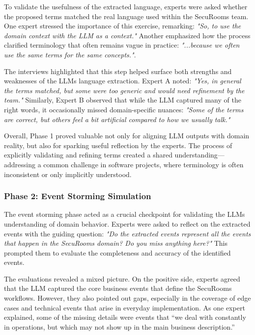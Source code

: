 To validate the usefulness of the extracted language, experts were asked whether the proposed terms matched the real language used within the SecuRooms team. One expert stressed the importance of this exercise, remarking: \textit{"So, to use the domain context with the LLM as a context."} Another emphasized how the process clarified terminology that often remains vague in practice: \textit{"...because we often use the same terms for the same concepts."}.  

The interviews highlighted that this step helped surface both strengths and weaknesses of the LLMs language extraction. Expert A noted: \textit{"Yes, in general the terms matched, but some were too generic and would need refinement by the team."} Similarly, Expert B observed that while the LLM captured many of the right words, it occasionally missed domain-specific nuances: \textit{"Some of the terms are correct, but others feel a bit artificial compared to how we usually talk."}  

Overall, Phase 1 proved valuable not only for aligning LLM outputs with domain reality, but also for sparking useful reflection by the experts. The process of explicitly validating and refining terms created a shared understanding—addressing a common challenge in software projects, where terminology is often inconsistent or only implicitly understood. 

\subsubsection{Phase 2: Event Storming Simulation}
The event storming phase acted as a crucial checkpoint for validating the LLMs understanding of domain behavior. Experts were asked to reflect on the extracted events with the guiding question: \textit{"Do the extracted events represent all the events that happen in the SecuRooms domain? Do you miss anything here?"} This prompted them to evaluate the completeness and accuracy of the identified events.  

The evaluations revealed a mixed picture. On the positive side, experts agreed that the LLM captured the core business events that define the SecuRooms workflows. However, they also pointed out gaps, especially in the coverage of edge cases and technical events that arise in everyday implementation. As one expert explained, some of the missing details were events that “we deal with constantly in operations, but which may not show up in the main business description.”  

